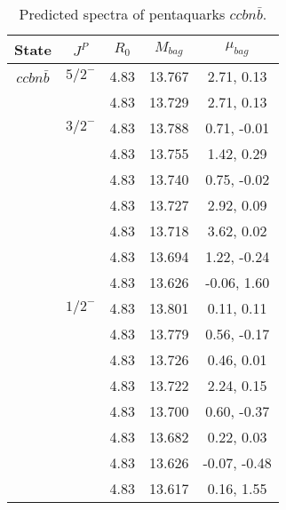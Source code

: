 \documentclass[prd,twocolumn,floatfix,nofootinbib]{revtex4}
\begin{document}
\renewcommand{\tabcolsep}{0.5cm}
\renewcommand{\arraystretch}{1.2}
\begin{table*}[!htbp]
    \caption{Predicted spectra of pentaquarks $ccbn\bar{b}$.}
    \begin{tabular}{ccccc}
        \hline\hline
        {\rm State} &$J^{P}$ &$R_{0}$ &$M_{bag}$ &$\mu_{bag}$ \\ \hline
        ${ccbn\bar{b}}$
            &${5/2}^{-}$    &4.83   &13.767 &2.71, 0.13 \\
            &               &4.83   &13.729 &2.71, 0.13 \\
            &${3/2}^{-}$    &4.83   &13.788 &0.71, -0.01 \\
            &               &4.83   &13.755 &1.42, 0.29 \\
            &               &4.83   &13.740 &0.75, -0.02 \\
            &               &4.83   &13.727 &2.92, 0.09 \\
            &               &4.83   &13.718 &3.62, 0.02 \\
            &               &4.83   &13.694 &1.22, -0.24 \\
            &               &4.83   &13.626 &-0.06, 1.60 \\
            &${1/2}^{-}$    &4.83   &13.801 &0.11, 0.11 \\
            &               &4.83   &13.779 &0.56, -0.17 \\
            &               &4.83   &13.726 &0.46, 0.01 \\
            &               &4.83   &13.722 &2.24, 0.15 \\
            &               &4.83   &13.700 &0.60, -0.37 \\
            &               &4.83   &13.682 &0.22, 0.03 \\
            &               &4.83   &13.626 &-0.07, -0.48 \\
            &               &4.83   &13.617 &0.16, 1.55 \\
        \hline\hline 
    \end{tabular}
\end{table*}
\end{document}
